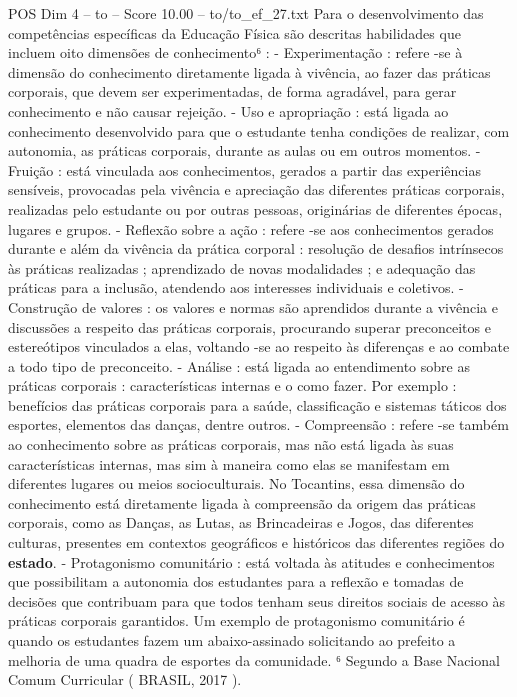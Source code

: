 \begin{textsample}{POS Dim 4 – to – Score 10.00 – to/to\_ef\_27.txt}
Para o desenvolvimento das competências específicas da Educação Física são descritas habilidades que incluem oito dimensões de conhecimento⁶ : - Experimentação : refere -se à dimensão do conhecimento diretamente ligada à vivência, ao fazer das práticas corporais, que devem ser experimentadas, de forma agradável, para gerar conhecimento e não causar rejeição. - Uso e apropriação : está ligada ao conhecimento desenvolvido para que o estudante tenha condições de realizar, com autonomia, as práticas corporais, durante as aulas ou em outros momentos. - Fruição : está vinculada aos conhecimentos, gerados a partir das experiências sensíveis, provocadas pela vivência e apreciação das diferentes práticas corporais, realizadas pelo estudante ou por outras pessoas, originárias de diferentes épocas, lugares e grupos. - Reflexão sobre a ação : refere -se aos conhecimentos gerados durante e além da vivência da prática corporal : resolução de desafios intrínsecos às práticas realizadas ; aprendizado de novas modalidades ; e adequação das práticas para a inclusão, atendendo aos interesses individuais e coletivos. - Construção de valores : os valores e normas são aprendidos durante a vivência e discussões a respeito das práticas corporais, procurando superar preconceitos e estereótipos vinculados a elas, voltando -se ao respeito às diferenças e ao combate a todo tipo de preconceito. - Análise : está ligada ao entendimento sobre as práticas corporais : características internas e o como fazer.
Por exemplo : benefícios das práticas corporais para a saúde, classificação e sistemas táticos dos esportes, elementos das danças, dentre outros. - Compreensão : refere -se também ao conhecimento sobre as práticas corporais, mas não está ligada às suas características internas, mas sim à maneira como elas se manifestam em diferentes lugares ou meios socioculturais.
No Tocantins, essa dimensão do conhecimento está diretamente ligada à compreensão da origem das práticas corporais, como as Danças, as Lutas, as Brincadeiras e Jogos, das diferentes culturas, presentes em contextos geográficos e históricos das diferentes regiões do \textbf{estado}. - Protagonismo comunitário : está voltada às atitudes e conhecimentos que possibilitam a autonomia dos estudantes para a reflexão e tomadas de decisões que contribuam para que todos tenham seus direitos sociais de acesso às práticas corporais garantidos.
Um exemplo de protagonismo comunitário é quando os estudantes fazem um abaixo-assinado solicitando ao prefeito a melhoria de uma quadra de esportes da comunidade. ⁶ Segundo a Base Nacional Comum Curricular ( BRASIL, 2017 ).

\end{textsample}
